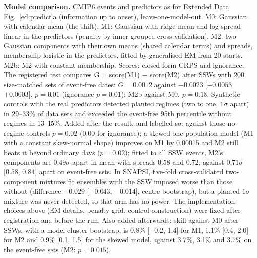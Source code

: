 \documentclass[11pt]{article}
\begin{document}
\textbf{Model comparison.} CMIP6 events and predictors as for Extended Data Fig.~\ref{ed:predict}a (information up to onset), leave-one-model-out. M0: Gaussian with calendar mean (the shift). M1: Gaussian with ridge mean and log-spread linear in the predictors (penalty by inner grouped cross-validation). M2: two Gaussian components with their own means (shared calendar terms) and spreads, membership logistic in the predictors, fitted by generalised EM from 20 starts. M2b: M2 with constant membership. Scores: closed-form CRPS and ignorance. The registered test compares G = score(M1) $-$ score(M2) after SSWs with 200 size-matched sets of event-free dates: $G = 0.0012$ against $-0.0023$ [$-0.0053$, $+0.0003$], $p = 0.01$ (ignorance $p = 0.01$); M2b against M0, $p = 0.18.$ Synthetic controls with the real predictors detected planted regimes (two to one, $1\sigma$ apart) in 29–33\% of data sets and exceeded the event-free 95th percentile without regimes in 13–15\%. Added after the result, and labelled so: against those no-regime controls $p = 0.02$ (0.00 for ignorance); a skewed one-population model (M1 with a constant skew-normal shape) improves on M1 by 0.00015 and M2 still beats it beyond ordinary days ($p = 0.02$); fitted to all SSW events, M2's components are $0.49\sigma$ apart in mean with spreads 0.58 and 0.72, against $0.71\sigma$ [0.58, 0.84] apart on event-free sets. In SNAPSI, five-fold cross-validated two-component mixtures fit ensembles with the SSW imposed worse than those without (difference $-0.029$ [$-0.043$, $-0.014$], centre bootstrap), but a planted $1\sigma$ mixture was never detected, so that arm has no power. The implementation choices above (EM details, penalty grid, control construction) were fixed after registration and before the run. Also added afterwards: skill against M0 after SSWs, with a model-cluster bootstrap, is 0.8\% [$-0.2$, 1.4] for M1, 1.1\% [0.4, 2.0] for M2 and 0.9\% [0.1, 1.5] for the skewed model, against 3.7\%, 3.1\% and 3.7\% on the event-free sets (M2: $p = 0.015$).
\end{document}
